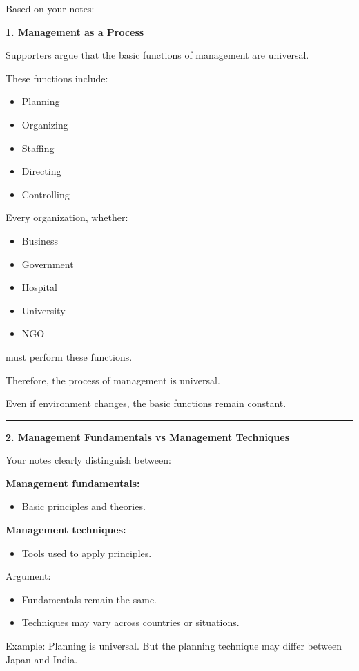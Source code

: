 \documentclass[10pt,a4paper]{article}
\newcommand{\separator}{\vspace{0.4em}\noindent\rule{\linewidth}{0.6pt}\vspace{0.4em}}
\begin{document}
Based on your notes:

\textbf{1. Management as a Process}

Supporters argue that the basic functions of management are universal.

These functions include:
\begin{itemize}
  \item Planning
  \item Organizing
  \item Staffing
  \item Directing
  \item Controlling
\end{itemize}

Every organization, whether:
\begin{itemize}
  \item Business
  \item Government
  \item Hospital
  \item University
  \item NGO
\end{itemize}

must perform these functions.

Therefore, the process of management is universal.

Even if environment changes, the basic functions remain constant.

\separator

\textbf{2. Management Fundamentals vs Management Techniques}

Your notes clearly distinguish between:

\textbf{Management fundamentals:}
\begin{itemize}
  \item Basic principles and theories.
\end{itemize}

\textbf{Management techniques:}
\begin{itemize}
  \item Tools used to apply principles.
\end{itemize}

Argument:
\begin{itemize}
  \item Fundamentals remain the same.
  \item Techniques may vary across countries or situations.
\end{itemize}

Example: Planning is universal. But the planning technique may differ between Japan and India.
\end{document}
